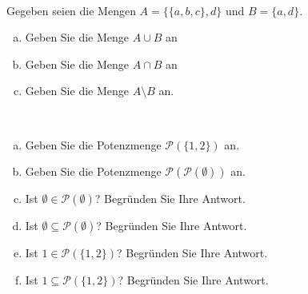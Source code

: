 \newcommand{\printpraesenzlsg}{false}
\newcommand{\printloesungen}{false}
\newcommand{\printbewertungen}{false}
\newcommand{\blattnummer}{1}




\iforiginal{}
\\
Gegeben seien die Mengen $A=\{\{a,b,c\},d\}$ und $B=\{a,d\}$.
\begin{enumerate}[a)]
\item Geben Sie die Menge $A\cup B$ an
\item Geben Sie die Menge $A\cap B$ an
\item Geben Sie die Menge $A\setminus B$ an.

\end{enumerate}

\\
\begin{enumerate}[a)]
    \item Geben Sie die Potenzmenge $\mathscr{P}(\{1,2\})$ an.
    \item Geben Sie die Potenzmenge $\mathscr{P}(\mathscr{P}(\emptyset))$ an.
    \item Ist $\emptyset\in\mathscr{P}(\emptyset)$? Begründen Sie Ihre Antwort. 
    \item Ist $\emptyset\subseteq\mathscr{P}(\emptyset)$? Begründen Sie Ihre Antwort.
    \item Ist $1\in\mathscr{P}(\{1,2\})$? Begründen Sie Ihre Antwort.
    \item Ist $1\subseteq\mathscr{P}(\{1,2\})$? Begründen Sie Ihre Antwort.
\end{enumerate}

